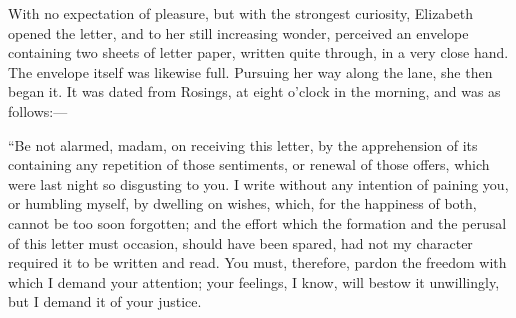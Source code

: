 \documentclass[10pt]{book}
\begin{document}
   With no expectation of pleasure, but with the strongest curiosity,
Elizabeth opened the letter, and to her still increasing wonder,
perceived an envelope containing two sheets of letter paper, written
quite through, in a very close hand. The envelope itself was likewise
full. Pursuing her way along the lane, she then began it. It was dated
from Rosings, at eight o’clock in the morning, and was as follows:—
  

   “Be not alarmed, madam, on receiving this letter, by the apprehension of
its containing any repetition of those sentiments, or renewal of those
offers, which were last night so disgusting to you. I write without any
intention of paining you, or humbling myself, by dwelling on wishes,
which, for the happiness of both, cannot be too soon forgotten; and the
effort which the formation and the perusal of this letter must occasion,
should have been spared, had not my character required it to be written
   and read. You must, therefore, pardon the freedom with which I demand
your attention; your feelings, I know, will bestow it unwillingly, but I
demand it of your justice.
  
\end{document}
